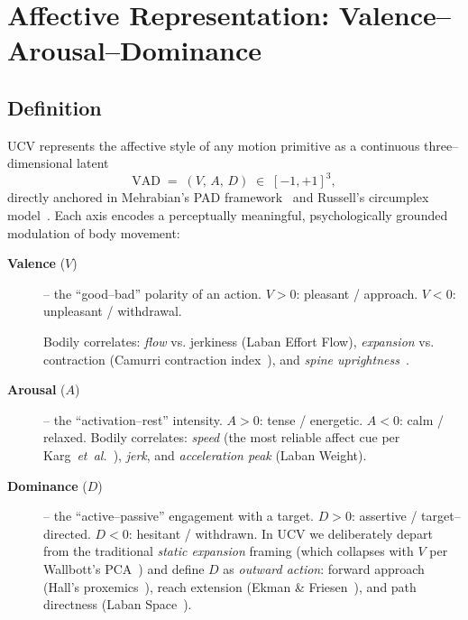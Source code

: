 
\section{Affective Representation: Valence--Arousal--Dominance}
\label{sec:vad}

\subsection{Definition}
\label{sec:vad-def}

UCV represents the affective style of any motion primitive as a continuous
three--dimensional latent
\begin{equation}
  \mathrm{VAD} \;=\; (V,\,A,\,D) \;\in\; [-1,+1]^3,
  \label{eq:vad-range}
\end{equation}
directly anchored in Mehrabian's PAD framework~\cite{mehrabian1996pad} and
Russell's circumplex model~\cite{russell1980circumplex}. Each axis encodes a
perceptually meaningful, psychologically grounded modulation of body movement:

\begin{description}
  \item[\textbf{Valence} ($V$)] -- the ``good--bad'' polarity of an action.
    $V>0$: pleasant / approach. $V<0$: unpleasant / withdrawal.
    
    Bodily correlates: \emph{flow} vs. jerkiness (Laban Effort\,\textperiodcentered\,Flow),
    \emph{expansion} vs. contraction (Camurri contraction index~\cite{camurri2003recognizing}),
    and \emph{spine uprightness}~\cite{boone2001children}.
  \item[\textbf{Arousal} ($A$)] -- the ``activation--rest'' intensity.
    $A>0$: tense / energetic. $A<0$: calm / relaxed.
    Bodily correlates: \emph{speed} (the most reliable affect cue per
    Karg~\textit{et~al.}~\cite{karg2013body}), \emph{jerk}, and
    \emph{acceleration peak} (Laban Weight).
  \item[\textbf{Dominance} ($D$)] -- the ``active--passive'' engagement with
    a target. $D>0$: assertive / target--directed. $D<0$: hesitant / withdrawn.
    In UCV we deliberately depart from the traditional \emph{static
    expansion} framing (which collapses with $V$
    per Wallbott's PCA~\cite{wallbott1998bodily}) and define $D$ as
    \emph{outward action}: forward approach
    (Hall's proxemics~\cite{hall1966hidden}), reach extension
    (Ekman \& Friesen~\cite{ekman1972hand}), and path directness
    (Laban Space~\cite{laban1947effort}).
\end{description}

